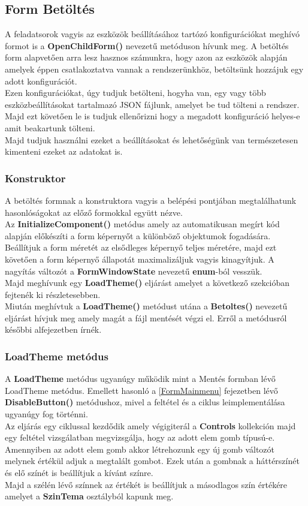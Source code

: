 \documentclass[tocnopagenum]{thesis-ekf}
\theoremstyle{definition}
\theoremstyle{remark}
\begin{document}
	\subsection{Form Betöltés}
	\label{Form Betoltes}
	A feladatsorok vagyis az eszközök beállításához tartózó konfigurációkat meghívó formot is a \textbf{OpenChildForm()} nevezetű metóduson hívunk meg. A betöltés form alapvetően arra lesz hasznos számunkra, hogy azon az eszközök alapján amelyek éppen csatlakoztatva vannak a rendszerünkhöz, betöltsünk hozzájuk egy adott konfigurációt.
	\\
	Ezen konfigurációkat, úgy tudjuk betölteni, hogyha van, egy vagy több eszközbeállításokat tartalmazó JSON fájlunk, amelyet be tud tölteni a rendszer. Majd ezt követően le is tudjuk ellenőrizni hogy a megadott konfiguráció helyes-e amit beakartunk tölteni.
	\\ 
	Majd tudjuk használni ezeket a beállításokat és lehetőségünk van természetesen kimenteni ezeket az adatokat is.
	\subsubsection{Konstruktor}
	A betöltés formnak a konstruktora vagyis a belépési pontjában megtalálhatunk hasonlóságokat az előző formokkal együtt nézve.
	\\
	 Az \textbf{InitializeComponent()} metódus amely az automatikusan megírt kód alapján előkészíti a form képernyőt a különböző objektumok fogadására. Beállítjuk a form méretét az elsődleges képernyő teljes méretére, majd ezt követően a form képernyő állapotát maximalizáljuk vagyis kinagyítjuk. A nagyítás változót a \textbf{FormWindowState} nevezetű \textbf{enum}-ból vesszük.
	\\
	Majd meghívunk egy \textbf{LoadTheme()} eljárást amelyet a következő szekcióban fejtenék ki részletesebben. 
	\\
	Miután meghívtuk a \textbf{LoadTheme()} metódust utána a \textbf{Betoltes()} nevezetű eljárást hívjuk meg amely magát a fájl mentését végzi el. Erről a metódusról későbbi alfejezetben írnék.
	\subsubsection{LoadTheme metódus}
	A \textbf{LoadTheme} metódus ugyanúgy működik mint a Mentés formban lévő LoadTheme metódus.
	Emellett hasonló a \ref{FormMainmenu} fejezetben lévő \textbf{DisableButton()} metódushoz, mivel a feltétel és a ciklus leimplementálása ugyanúgy fog történni. 
	\\
	Az eljárás egy ciklussal kezdődik amely végigiterál a \textbf{Controls} kollekción majd egy feltétel vizsgálatban megvizsgálja, hogy az adott elem gomb típusú-e. Amennyiben az adott elem gomb akkor létrehozunk egy új gomb változót melynek értékül adjuk a megtalált gombot. Ezek után a gombnak a háttérszínét és elő színét is beállítjuk a kívánt színre. 
	\\
	Majd a szélén lévő színnek az értékét is beállítjuk a másodlagos szín értékére amelyet a \textbf{SzinTema} osztályból kapunk meg.
\end{document}
